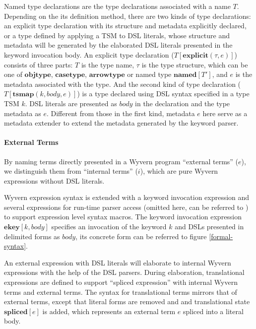 \documentclass{sig-alternate}
\begin{document}
Named type declarations are the type declarations associated with a name $T$. Depending on the its definition method, there are two kinds of type declarations: an explicit type declaration with its structure and metadata explicitly declared, or a type defined by applying a TSM to DSL literals, whose structure and metadata will be generated by the elaborated DSL literals presented in the keyword invocation body. An explicit type declaration ($T[\mathbf{explicit}(\tau,e)]$) consists of three parts: $T$ is the type name, $\tau$ is the type structure, which can be one of $\mathbf{objtype}$, $\mathbf{casetype}$, $\mathbf{arrowtype}$ or named type $\mathbf{named}[T']$,  and $e$ is the metadata associated with the type. And the second kind of type declaration ($T[\mathbf{tsmap}(k,body,e)]$) is a type declared using DSL syntax specified in a type TSM $k$. DSL literals are presented as $body$ in the declaration and the type metadata as $e$. Different from those in the first kind, metadata $e$ here serve as a metadata extender to extend the metadata generated by the keyword parser.


\paragraph{External Terms}
By naming terms directly presented in a Wyvern program ``external terms'' ($e$), we distinguish them from ``internal terms'' ($i$), which are pure Wyvern expressions without DSL literals. 

Wyvern expression syntax is extended with a keyword invocation expression and several expressions for run-time parser access (omitted here, can be referred to ) to support expression level syntax macros. The keyword invocation expression $\mathbf{ekey}[k,body]$ specifies an invocation of the keyword $k$ and DSLs presented in delimited forms as $body$, its concrete form can be referred to figure \ref{formal-syntax}.

An external expression with DSL literals will elaborate to internal Wyvern expressions with the help of the DSL parsers. During elaboration, translational expressions  
are defined to support ``spliced expression'' with internal Wyvern terms and external terms. The syntax for translational terms mirrors that of external terms, except that literal forms are removed and and translational state $\mathbf{spliced}[e]$ is added, which represents an external term $e$ spliced into a literal body.
\end{document}
